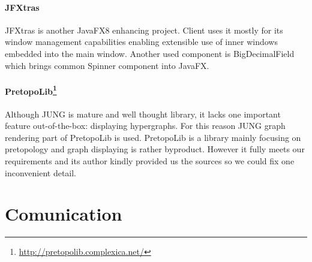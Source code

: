 \paragraph{JFXtras}
JFXtras is another JavaFX8 enhancing project. \textan{} Client uses it mostly
for its window management capabilities enabling extensible use of inner windows
embedded into the main window. Another used component is BigDecimalField which
brings common Spinner component into JavaFX.


\paragraph{PretopoLib\footnote{\url{http://pretopolib.complexica.net/}}}
Although JUNG is mature and well thought library, it lacks one important feature
out-of-the-box: displaying hypergraphs. For this reason JUNG graph rendering
part of PretopoLib is used. PretopoLib is a library mainly focusing on
pretopology and graph displaying is rather byproduct. However it fully meets our
requirements and its author kindly provided us the sources so we could fix one
inconvenient detail.

\section{Comunication}
